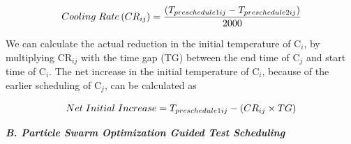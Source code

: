 \documentclass[conference]{IEEEtran}
\begin{document}
\begin{equation}
Cooling \hspace{.1cm} Rate \left(CR_{ij}\right) = \frac{\left(T_{preschedule1ij}-T_{preschedule2ij}\right)}{2000}\\
\end{equation}

We can calculate the actual reduction in the initial temperature
of C$_{i}$, by multiplying CR$_{ij}$ with the time gap (TG) between
the end time of C$_{j}$ and start time of C$_{i}$. The net increase in
the initial temperature of C$_{i}$, because of the earlier scheduling
of C$_{j}$, can be calculated as

\begin{equation}
Net \hspace{.1cm} Initial \hspace{.1cm} Increase = T_{preschedule1ij}-\left(CR_{ij} \times TG\right)
\end{equation}

\textbf{\textit{B. Particle Swarm Optimization Guided Test Scheduling}}\\
\end{document}
